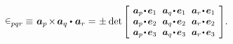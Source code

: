 \nopagebreak\vspace{-0.4em}
\begin{equation*}
\permutationsparitysymbols{pqr} \hspace{-0.15ex}
\equiv \hspace{.16ex} \bm{a}_p \hspace{-0.25ex} \times \hspace{-0.25ex} \bm{a}_q \dotp \hspace{.1ex} \bm{a}_r =
\hspace{.1ex} \pm \hspace{.1ex} \determinant\hspace{-0.1ex}
\scalebox{.92}{$\left[\hspace{-0.2ex}\begin{array}{c@{\hspace{.64em}}c@{\hspace{.64em}}c}
\bm{a}_p \narrowdotp\hspace{.12ex} \bm{e}_1 & \bm{a}_q \narrowdotp\hspace{.12ex} \bm{e}_1 & \bm{a}_r \narrowdotp\hspace{.12ex} \bm{e}_1 \\
\bm{a}_p \narrowdotp\hspace{.12ex} \bm{e}_2 & \bm{a}_q \narrowdotp\hspace{.12ex} \bm{e}_2 & \bm{a}_r \narrowdotp\hspace{.12ex} \bm{e}_2 \\
\bm{a}_p \narrowdotp\hspace{.12ex} \bm{e}_3 & \bm{a}_q \narrowdotp\hspace{.12ex} \bm{e}_3 & \bm{a}_r \narrowdotp\hspace{.12ex} \bm{e}_3
\end{array}\hspace{-0.12ex}\right]$} .
\end{equation*}

